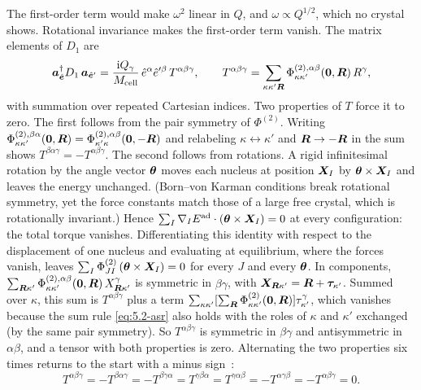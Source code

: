 The first-order term would make $\omega^2$ linear in $Q$, and $\omega \propto Q^{1/2}$, which no crystal shows. Rotational invariance makes the first-order term vanish. The matrix elements of $D_1$ are
\begin{equation*}
  \bm{a}_{\hat{\bm{e}}}^\dagger D_1\,\bm{a}_{\hat{\bm{e}}'} = \frac{\mathrm{i} Q_\gamma}{M_{\mathrm{cell}}}\,\hat e^\alpha\hat e'^\beta\,T^{\alpha\beta\gamma} , \qquad
  T^{\alpha\beta\gamma} = \sum_{\kappa\kappa'\bm{R}}\Phi^{(2),\alpha\beta}_{\kappa\kappa'}(\bm{0},\bm{R})\,R^\gamma ,
\end{equation*}
with summation over repeated Cartesian indices. Two properties of $T$ force it to zero. The first follows from the pair symmetry of $\Phi^{(2)}$. Writing $\Phi^{(2),\beta\alpha}_{\kappa\kappa'}(\bm{0},\bm{R}) = \Phi^{(2),\alpha\beta}_{\kappa'\kappa}(\bm{0},-\bm{R})$ and relabeling $\kappa \leftrightarrow \kappa'$ and $\bm{R} \to -\bm{R}$ in the sum shows $T^{\beta\alpha\gamma} = -T^{\alpha\beta\gamma}$. The second follows from rotations. A rigid infinitesimal rotation by the angle vector $\bm{\theta}$ moves each nucleus at position $\bm{X}_I$ by $\bm{\theta}\times\bm{X}_I$ and leaves the energy unchanged. (Born--von Karman conditions break rotational symmetry, yet the force constants match those of a large free crystal, which is rotationally invariant.) Hence $\sum_I\nabla_IE^{\mathrm{ad}}\cdot(\bm{\theta}\times\bm{X}_I) = 0$ at every configuration: the total torque vanishes. Differentiating this identity with respect to the displacement of one nucleus and evaluating at equilibrium, where the forces vanish, leaves $\sum_I\Phi^{(2)}_{JI}\,(\bm{\theta}\times\bm{X}_I) = 0$ for every $J$ and every $\bm{\theta}$. In components, $\sum_{\bm{R}\kappa'}\Phi^{(2),\alpha\beta}_{\kappa\kappa'}(\bm{0},\bm{R})\,X^\gamma_{\bm{R}\kappa'}$ is symmetric in $\beta\gamma$, with $\bm{X}_{\bm{R}\kappa'} = \bm{R} + \bm{\tau}_{\kappa'}$. Summed over $\kappa$, this sum is $T^{\alpha\beta\gamma}$ plus a term $\sum_{\kappa\kappa'}[\sum_{\bm{R}}\Phi^{(2)}_{\kappa\kappa'}(\bm{0},\bm{R})]\tau^\gamma_{\kappa'}$, which vanishes because the sum rule \cref{eq:5.2-asr} also holds with the roles of $\kappa$ and $\kappa'$ exchanged (by the same pair symmetry). So $T^{\alpha\beta\gamma}$ is symmetric in $\beta\gamma$ and antisymmetric in $\alpha\beta$, and a tensor with both properties is zero. Alternating the two properties six times returns to the start with a minus sign~\cite[Chap.~V]{born1954dynamical}:
\begin{equation*}
  T^{\alpha\beta\gamma} = -T^{\beta\alpha\gamma} = -T^{\beta\gamma\alpha} = T^{\gamma\beta\alpha} = T^{\gamma\alpha\beta} = -T^{\alpha\gamma\beta} = -T^{\alpha\beta\gamma} = 0 .
\end{equation*}

